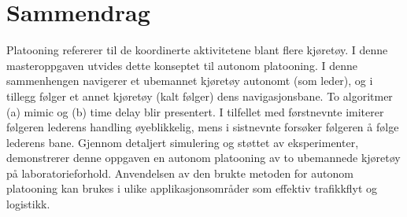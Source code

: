 \chapter*{Sammendrag}

Platooning refererer til de koordinerte aktivitetene blant flere kjøretøy. I denne masteroppgaven utvides dette konseptet til autonom platooning. I denne sammenhengen navigerer et ubemannet kjøretøy autonomt (som leder), og i tillegg følger et annet kjøretøy (kalt følger) dens navigasjonsbane. To algoritmer (a) mimic og (b) time delay blir presentert. I tilfellet med førstnevnte imiterer følgeren lederens handling øyeblikkelig, mens i sistnevnte forsøker følgeren å følge lederens bane. Gjennom detaljert simulering og støttet av eksperimenter, demonstrerer denne oppgaven en autonom platooning av to ubemannede kjøretøy på laboratorieforhold. Anvendelsen av den brukte metoden for autonom platooning kan brukes i ulike applikasjonsområder som effektiv trafikkflyt og logistikk.